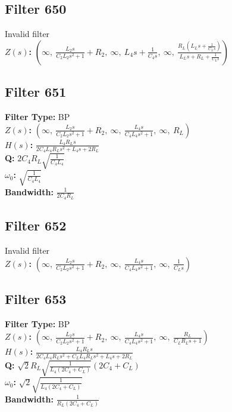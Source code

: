 \documentclass{article}
\begin{document}
\subsection*{Filter 650}
Invalid filter \\ 
\textbf{$Z(s)$:} $\left( \infty, \  \frac{L_{2} s}{C_{2} L_{2} s^{2} + 1} + R_{2}, \  \infty, \  L_{4} s + \frac{1}{C_{4} s}, \  \infty, \  \frac{R_{L} \left(L_{L} s + \frac{1}{C_{L} s}\right)}{L_{L} s + R_{L} + \frac{1}{C_{L} s}}\right)$ \\ 
\subsection*{Filter 651}
\textbf{Filter Type:} BP \\ 
\textbf{$Z(s)$:} $\left( \infty, \  \frac{L_{2} s}{C_{2} L_{2} s^{2} + 1} + R_{2}, \  \infty, \  \frac{L_{4} s}{C_{4} L_{4} s^{2} + 1}, \  \infty, \  R_{L}\right)$ \\ 
\textbf{$H(s)$:} $\frac{L_{4} R_{L} s}{2 C_{4} L_{4} R_{L} s^{2} + L_{4} s + 2 R_{L}}$ \\ 
\textbf{Q:} $2 C_{4} R_{L} \sqrt{\frac{1}{C_{4} L_{4}}}$ \\ 
\textbf{$\omega_0$:} $\sqrt{\frac{1}{C_{4} L_{4}}}$ \\ 
\textbf{Bandwidth:} $\frac{1}{2 C_{4} R_{L}}$ \\ 
\subsection*{Filter 652}
Invalid filter \\ 
\textbf{$Z(s)$:} $\left( \infty, \  \frac{L_{2} s}{C_{2} L_{2} s^{2} + 1} + R_{2}, \  \infty, \  \frac{L_{4} s}{C_{4} L_{4} s^{2} + 1}, \  \infty, \  \frac{1}{C_{L} s}\right)$ \\ 
\subsection*{Filter 653}
\textbf{Filter Type:} BP \\ 
\textbf{$Z(s)$:} $\left( \infty, \  \frac{L_{2} s}{C_{2} L_{2} s^{2} + 1} + R_{2}, \  \infty, \  \frac{L_{4} s}{C_{4} L_{4} s^{2} + 1}, \  \infty, \  \frac{R_{L}}{C_{L} R_{L} s + 1}\right)$ \\ 
\textbf{$H(s)$:} $\frac{L_{4} R_{L} s}{2 C_{4} L_{4} R_{L} s^{2} + C_{L} L_{4} R_{L} s^{2} + L_{4} s + 2 R_{L}}$ \\ 
\textbf{Q:} $\sqrt{2} R_{L} \sqrt{\frac{1}{L_{4} \left(2 C_{4} + C_{L}\right)}} \left(2 C_{4} + C_{L}\right)$ \\ 
\textbf{$\omega_0$:} $\sqrt{2} \sqrt{\frac{1}{L_{4} \left(2 C_{4} + C_{L}\right)}}$ \\ 
\textbf{Bandwidth:} $\frac{1}{R_{L} \left(2 C_{4} + C_{L}\right)}$ \\ 
\end{document}
